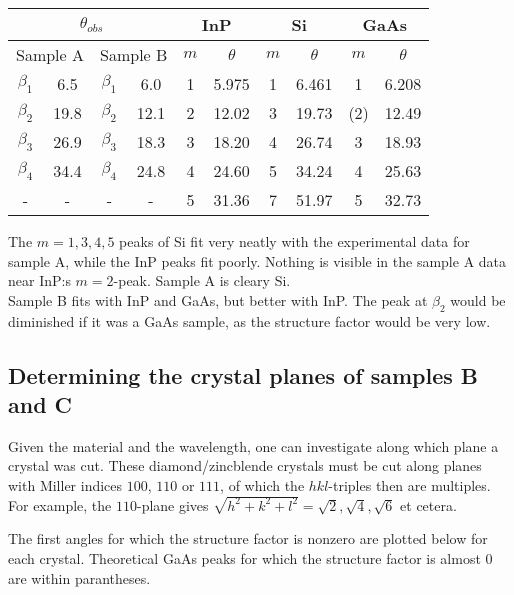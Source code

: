 \documentclass[a4paper,twoside=false,abstract=false,numbers=noenddot,
titlepage=false,headings=small,parskip=half,version=last]{scrartcl}
\begin{document}
\begin{tabular}{ |c|c|c|c|c|c|c|c|c|c| }
    \hline
    \multicolumn{4}{|c|}{$\theta_{obs}$}
	& \multicolumn{2}{|c|}{InP}
	& \multicolumn{2}{|c|}{Si}
	& \multicolumn{2}{|c|}{GaAs}\\
    \hline
	\multicolumn{2}{|c|}{Sample A} & \multicolumn{2}{|c|}{Sample B} & $m$ & $\theta$ & $m$ & $\theta$ & $m$ & $\theta$ \\
	\hline
    $\beta_1$	& 6.5\degree	& $\beta_1$	& 6.0\degree	& 1 & 5.975\degree & 1	& 6.461\degree &  1		& 6.208\degree	\\
    $\beta_2$	& 19.8\degree	& $\beta_2$	& 12.1\degree	& 2 & 12.02\degree & 3	& 19.73\degree & (2)	& 12.49\degree	\\
    $\beta_3$	& 26.9\degree	& $\beta_3$	& 18.3\degree	& 3 & 18.20\degree & 4	& 26.74\degree &  3		& 18.93\degree	\\
    $\beta_4$	& 34.4\degree	& $\beta_4$	& 24.8\degree	& 4 & 24.60\degree & 5	& 34.24\degree &  4		& 25.63\degree	\\
    -			& -				& -			& -				& 5 & 31.36\degree & 7	& 51.97\degree &  5		& 32.73\degree	\\
	\hline
\end{tabular}

The $m=1,3,4,5$ peaks of Si fit very neatly with the experimental data for sample A, while the InP peaks fit poorly.
Nothing is visible in the sample A data near InP:s $m=2$-peak.
Sample A is cleary Si.\\
Sample B fits with InP and GaAs, but better with InP. The peak at $\beta_2$ would be diminished if it was a GaAs sample, as the structure factor would be very low. 

\subsection{Determining the crystal planes of samples B and C}

Given the material and the wavelength, one can investigate along which plane a crystal was cut.
These diamond/zincblende crystals must be cut along planes with Miller indices $100$, $110$ or $111$, of which the $hkl$-triples then are multiples.
For example, the $110$-plane gives $\sqrt{h^2+k^2+l^2}=\sqrt{2},\sqrt{4},\sqrt{6}$ et cetera.

The first angles for which the structure factor is nonzero are plotted below for each crystal.
Theoretical GaAs peaks for which the structure factor is almost 0 are within parantheses.
\end{document}
